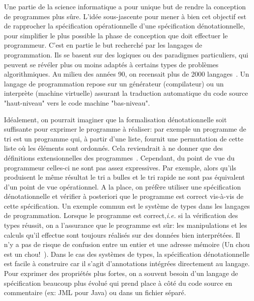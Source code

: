 Une partie de la science informatique a pour unique but de rendre la conception de programmes
plus sûre. L'idée sous-jascente pour mener à bien cet objectif est de rapprocher 
la spécification opérationnelle d'une spécification dénotationnelle,
pour simplifier le plus possible la phase de conception que doit effectuer le programmeur.
C'est en partie le but recherché par les langages de programmation.
Ils se basent sur des logiques ou des paradigmes particuliers, qui peuvent se révéler plus ou moins
adaptés à certains types de problèmes algorithmiques. Au milieu des années 90, on recensait plus 
de 2000 langages~\cite{DOWEK-LANG}. Un langage de programmation repose 
sur un générateur (compilateur) ou un interprète (machine virtuelle) assurant la traduction automatique
du code source "haut-niveau" vers le code machine "bas-niveau".

Idéalement, on pourrait imaginer que la formalisation dénotationnelle soit suffisante
pour exprimer le programme à réaliser: par exemple un programme de tri est un programme
qui, à partir d'une liste, fournit une permutation de cette liste où les éléments sont
ordonnés. Cela reviendrait à ne donner que des définitions extensionnelles des programmes~\cite{DOWEK-LANG}.
Cependant, du point de vue du programmeur celles-ci ne sont pas assez expressives. 
Par exemple, alors qu'ils produisent le même résultat le tri a bulles et le tri rapide ne sont pas équivalent
d'un point de vue opérationnel.
A la place, on préfère utiliser une spécification dénotationnelle et vérifier à posteriori
que le programme est correct vis-à-vis de cette spécification. 
Un exemple commun est le système de types dans les langages de programmation. 
Lorsque le programme est correct,\textit{i.e.} si la vérification des types réussit,
on a l'assurance que le programme est sûr: 
les manipulations et les calculs qu'il effectue sont toujours réalisés sur des données
bien interprétées. Il n'y a pas de risque de confusion entre un entier et une adresse mémoire
(Un chou est un chou!~\cite{ASTERIX}).
Dans le cas des systèmes de types, la spécification dénotationnelle est facile à construire
car il s'agit d'annotations intégrées directement au langage. Pour exprimer
des propriétés plus fortes, on a souvent besoin d'un langage de spécification beaucoup
plus évolué qui prend place à côté du code source en commentaire (ex: JML pour Java) ou 
dans un fichier séparé.

